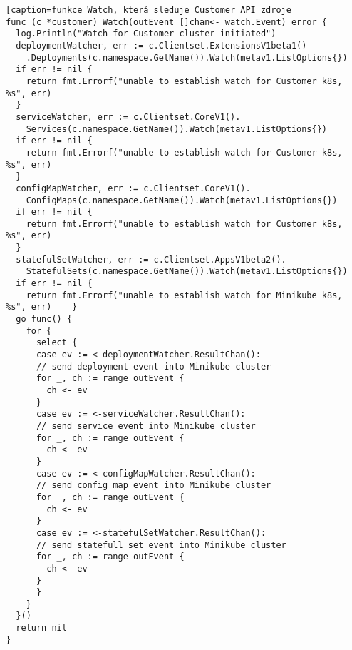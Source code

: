 \begin{lstlisting}[caption=funkce Watch, která sleduje Customer API zdroje
func (c *customer) Watch(outEvent []chan<- watch.Event) error {
  log.Println("Watch for Customer cluster initiated")
  deploymentWatcher, err := c.Clientset.ExtensionsV1beta1()
    .Deployments(c.namespace.GetName()).Watch(metav1.ListOptions{})
  if err != nil {
    return fmt.Errorf("unable to establish watch for Customer k8s, %s", err)
  }
  serviceWatcher, err := c.Clientset.CoreV1().
    Services(c.namespace.GetName()).Watch(metav1.ListOptions{})
  if err != nil {
    return fmt.Errorf("unable to establish watch for Customer k8s, %s", err)
  }
  configMapWatcher, err := c.Clientset.CoreV1().
    ConfigMaps(c.namespace.GetName()).Watch(metav1.ListOptions{})
  if err != nil {
    return fmt.Errorf("unable to establish watch for Customer k8s, %s", err)
  }
  statefulSetWatcher, err := c.Clientset.AppsV1beta2().
    StatefulSets(c.namespace.GetName()).Watch(metav1.ListOptions{})
  if err != nil {
    return fmt.Errorf("unable to establish watch for Minikube k8s, %s", err)    }
  go func() {
    for {
      select {
      case ev := <-deploymentWatcher.ResultChan():
      // send deployment event into Minikube cluster
      for _, ch := range outEvent {
        ch <- ev
      }
      case ev := <-serviceWatcher.ResultChan():
      // send service event into Minikube cluster
      for _, ch := range outEvent {
        ch <- ev
      }
      case ev := <-configMapWatcher.ResultChan():
      // send config map event into Minikube cluster
      for _, ch := range outEvent {
        ch <- ev
      }
      case ev := <-statefulSetWatcher.ResultChan():
      // send statefull set event into Minikube cluster
      for _, ch := range outEvent {
        ch <- ev
      }
      }
    }
  }()
  return nil
}
\end{lstlisting}
